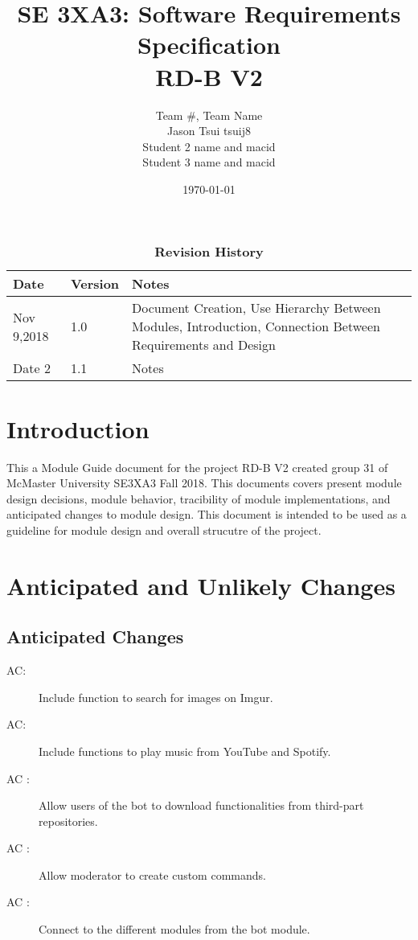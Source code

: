 \documentclass[12pt, titlepage]{article}
\title{SE 3XA3: Software Requirements Specification\\RD-B V2}
\author{Team \#, Team Name
		\\ Jason Tsui tsuij8
		\\ Student 2 name and macid
		\\ Student 3 name and macid
}
\date{\today}
\newcounter{acnum}
\newcommand{\actheacnum}{AC\theacnum}
\begin{document}
\maketitle

\tableofcontents
\listoftables
\listoffigures

\begin{table}[bp]
\caption{\bf Revision History}
\begin{tabularx}{\textwidth}{p{3cm}p{2cm}X}
\toprule {\bf Date} & {\bf Version} & {\bf Notes}\\
\midrule
Nov 9,2018 & 1.0 & Document Creation, Use Hierarchy Between Modules, Introduction, Connection Between Requirements and Design\\
Date 2 & 1.1 & Notes\\
\bottomrule
\end{tabularx}
\end{table}

\newpage


\section{Introduction}

This a Module Guide document for the project RD-B V2 created group 31 of McMaster University SE3XA3 Fall 2018. This documents covers present module design decisions, module behavior, tracibility of module implementations, and anticipated changes to module design. This document is intended to be used as a guideline for module design and overall strucutre of the project. 

\section{Anticipated and Unlikely Changes} \label{SecChange}


\subsection{Anticipated Changes} \label{SecAchange}


\begin{description}
\item[ \actheacnum \label{acImage}:] Include function to search for images on Imgur.
\item[ \actheacnum \label{acAudio}:] Include functions to play music from YouTube and Spotify.
\item[ \actheacnum
\label{acDownloader}:] Allow users of the bot to download functionalities from third-part repositories.
\item[ \actheacnum
\label{acCustomcom}:] Allow moderator to create custom commands.
\item[ \actheacnum
\label{acBot}:] Connect to the different modules from the bot module.
\end{description}
\end{document}
